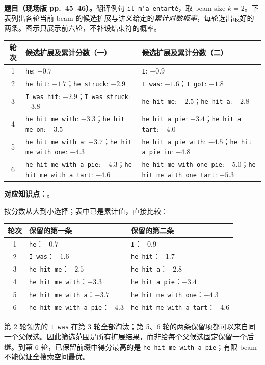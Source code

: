 \nopagebreak[4]
\textbf{题目（现场版 pp.~45--46）。}翻译例句 \texttt{il m'a entart\'{e}}，取 beam size $k=2$。下表列出各轮当前 beam 的候选扩展与讲义给定的\emph{累计对数概率}，每轮选出最好的两条。图示只展示前六轮，不补设结束符的概率。
\begin{center}
\small
\begin{tabularx}{\textwidth}{@{}c>{\raggedright\arraybackslash}X>{\raggedright\arraybackslash}X@{}}
\toprule
轮次 & 候选扩展及累计分数（一） & 候选扩展及累计分数（二） \\
\midrule
1 & \texttt{he}: $-0.7$ & \texttt{I}: $-0.9$ \\
2 & \texttt{he hit}: $-1.7$；\texttt{he struck}: $-2.9$ & \texttt{I was}: $-1.6$；\texttt{I got}: $-1.8$ \\
3 & \texttt{I was hit}: $-2.9$；\texttt{I was struck}: $-3.8$ & \texttt{he hit me}: $-2.5$；\texttt{he hit a}: $-2.8$ \\
4 & \texttt{he hit me with}: $-3.3$；\texttt{he hit me on}: $-3.5$ & \texttt{he hit a pie}: $-3.4$；\texttt{he hit a tart}: $-4.0$ \\
5 & \texttt{he hit me with a}: $-3.7$；\texttt{he hit me with one}: $-4.3$ & \texttt{he hit a pie with}: $-4.5$；\texttt{he hit a pie in}: $-4.8$ \\
6 & \texttt{he hit me with a pie}: $-4.3$；\texttt{he hit me with a tart}: $-4.6$ & \texttt{he hit me with one pie}: $-5.0$；\texttt{he hit me with one tart}: $-5.3$ \\
\bottomrule
\end{tabularx}
\end{center}

\textbf{对应知识点：}。

\begin{workedsolution}
按分数从大到小选择；表中已是累计值，直接比较：
\begin{center}
\small
\begin{tabularx}{\textwidth}{@{}cXX@{}}
\toprule
轮次 & 保留的第一条 & 保留的第二条 \\
\midrule
1 & \texttt{he}：$-0.7$ & \texttt{I}：$-0.9$ \\
2 & \texttt{I was}：$-1.6$ & \texttt{he hit}：$-1.7$ \\
3 & \texttt{he hit me}：$-2.5$ & \texttt{he hit a}：$-2.8$ \\
4 & \texttt{he hit me with}：$-3.3$ & \texttt{he hit a pie}：$-3.4$ \\
5 & \texttt{he hit me with a}：$-3.7$ & \texttt{he hit me with one}：$-4.3$ \\
6 & \texttt{he hit me with a pie}：$-4.3$ & \texttt{he hit me with a tart}：$-4.6$ \\
\bottomrule
\end{tabularx}
\end{center}
第 2 轮领先的 \texttt{I was} 在第 3 轮全部淘汰；第 5、6 轮的两条保留项都可以来自同一个父候选。因此筛选范围是所有扩展结果，而非给每个父候选固定保留一个后继。到第 6 轮，已保留前缀中得分最高的是 \texttt{he hit me with a pie}；有限 beam 不能保证全搜索空间最优。
\end{workedsolution}
\endgroup
